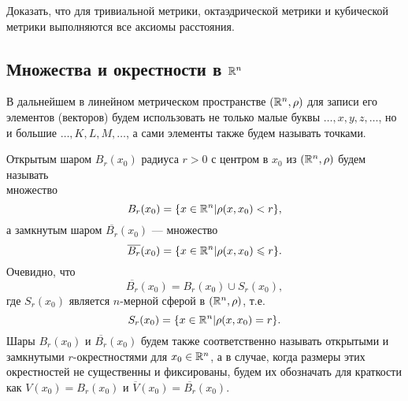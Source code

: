\begin{exercise}
    Доказать, что для тривиальной метрики, октаэдрической метрики и кубической метрики выполняются все аксиомы расстояния.
\end{exercise}

\subsection{Множества и окрестности в $ \mathbb{R}^n $}

В дальнейшем в линейном метрическом пространстве $\left( \mathbb{R}^n, \rho \right)$ для записи его элементов (векторов) будем использовать не только малые буквы
$\ldots, x, y, z, \ldots$, но и большие $\ldots, K, L, M, \ldots$, а сами элементы также будем называть точками.

Открытым шаром $B_r (x_0)$ радиуса $r > 0$ с центром в $x_0$ из $\left( \mathbb{R}^n, \rho \right)$ будем называть \\множество
\begin{equation*}
	B_r (x_0) = \{x \in \mathbb{R}^n | \rho (x, x_0) < r\},
\end{equation*}
а замкнутым шаром $\overline{B_r}(x_0)$ — множество
\begin{equation*}
\overline{B_r}(x_0) = \{x \in \mathbb{R}^n | \rho (x, x_0) \leqslant r\}.
\end{equation*}
Очевидно, что
\begin{equation*}
\overline{B_r}(x_0) = B_r (x_0) \cup S_r (x_0),
\end{equation*}
где $S_r (x_0)$ является $n$-мерной сферой в $\left( \mathbb{R}^n, \rho \right)$, т.е.
\begin{equation*}
S_r (x_0) = \{x \in \mathbb{R}^n | \rho (x, x_0) = r\}.
\end{equation*}
Шары $B_r (x_0)$ и $\overline{B_r}(x_0)$ будем также соответственно называть открытыми и замкнутыми $r$-окрестностями для $x_0 \in \mathbb{R}^n$, а в случае, когда размеры этих окрестностей не существенны и фиксированы, будем их обозначать для краткости как $V(x_0) = B_r (x_0)$ и $ \overline{V}(x_0) = \overline{B_r}(x_0)$.

